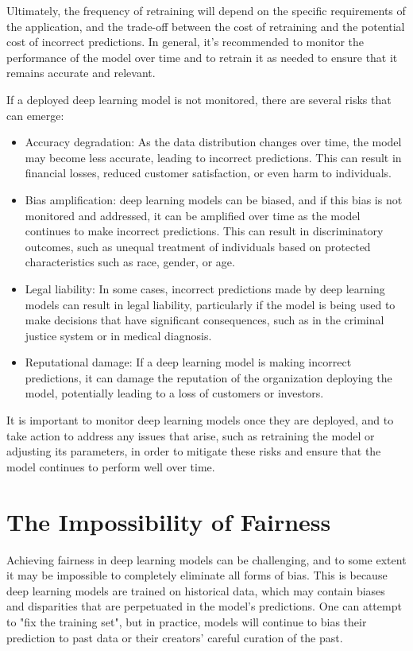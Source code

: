 Ultimately, the frequency of retraining will depend on the specific requirements of the application, and the trade-off between the cost of retraining and the potential cost of incorrect predictions. In general, it’s recommended to monitor the performance of the model over time and to retrain it as needed to ensure that it remains accurate and relevant.

If a deployed deep learning model is not monitored, there are several risks that can emerge:

\begin{itemize}
\item Accuracy degradation: As the data distribution changes over time, the model may become less accurate, leading to incorrect predictions. This can result in financial losses, reduced customer satisfaction, or even harm to individuals.
\item Bias amplification: deep learning models can be biased, and if this bias is not monitored and addressed, it can be amplified over time as the model continues to make incorrect predictions. This can result in discriminatory outcomes, such as unequal treatment of individuals based on protected characteristics such as race, gender, or age.
\item Legal liability: In some cases, incorrect predictions made by deep learning models can result in legal liability, particularly if the model is being used to make decisions that have significant consequences, such as in the criminal justice system or in medical diagnosis.
\item Reputational damage: If a deep learning model is making incorrect predictions, it can damage the reputation of the organization deploying the model, potentially leading to a loss of customers or investors.
\end{itemize}


It is important to monitor deep learning models once they are deployed, and to take action to address any issues that arise, such as retraining the model or adjusting its parameters, in order to mitigate these risks and ensure that the model continues to perform well over time.

\section{The Impossibility of Fairness}

Achieving fairness in deep learning models can be challenging, and to some extent it may be impossible to completely eliminate all forms of bias. This is because deep learning models are trained on historical data, which may contain biases and disparities that are perpetuated in the model's predictions. One can attempt to "fix the training set", but in practice, models will continue to bias their prediction to past data or their creators' careful curation of the past.

